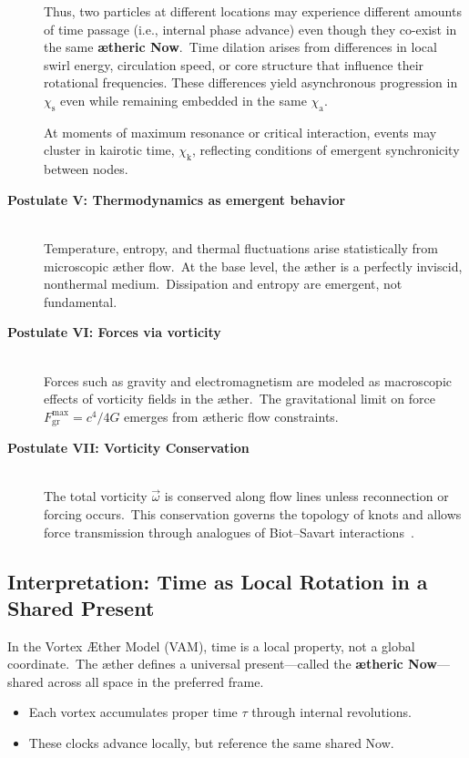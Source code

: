 \begin{description}
    Thus, two particles at different locations may experience different amounts of time passage (i.e., internal phase advance) even though they co-exist in the same \textbf{ætheric Now}.\ Time dilation arises from differences in local swirl energy, circulation speed, or core structure that influence their rotational frequencies. These differences yield asynchronous progression in $\chi_{\mathrm{s}}$ even while remaining embedded in the same $\chi_{\mathrm{a}}$.


At moments of maximum resonance or critical interaction, events may cluster in kairotic time, $\chi_{\mathrm{k}}$, reflecting conditions of emergent synchronicity between nodes.


    \item[\textbf{Postulate V: Thermodynamics as emergent behavior}] \hfill \\
    Temperature, entropy, and thermal fluctuations arise statistically from microscopic æther flow.\ At the base level, the æther is a perfectly inviscid, nonthermal medium.\ Dissipation and entropy are emergent, not fundamental.

    \item[\textbf{Postulate VI: Forces via vorticity}] \hfill \\
    Forces such as gravity and electromagnetism are modeled as macroscopic effects of vorticity fields in the æther.\ The gravitational limit on force $F^{\max}_{\text{gr}} = c^4 / 4 G$ emerges from ætheric flow constraints.

    \item[\textbf{Postulate VII: Vorticity Conservation}] \hfill \\
    The total vorticity $\vec{\omega}$ is conserved along flow lines unless reconnection or forcing occurs.\ This conservation governs the topology of knots and allows force transmission through analogues of Biot–Savart interactions~\cite{helmholtz1858vortices}.
\end{description}


\subsection*{Interpretation: Time as Local Rotation in a Shared Present}

In the Vortex Æther Model (VAM), time is a local property, not a global coordinate.\ The æther defines a universal present—called the \textbf{ætheric Now}—shared across all space in the preferred frame.

\begin{itemize}
    \item Each vortex accumulates proper time $\tau$ through internal revolutions.
    \item These clocks advance locally, but reference the same shared Now.
\end{itemize}


